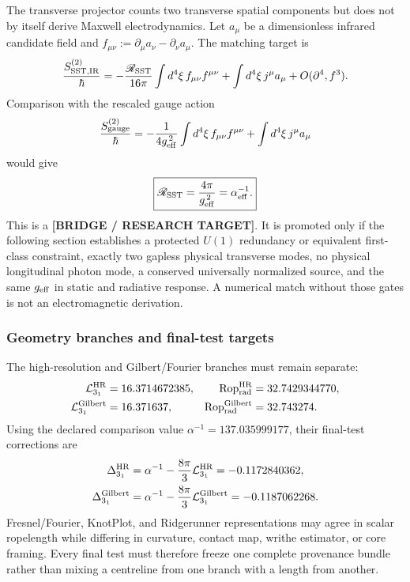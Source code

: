 The transverse projector counts two transverse spatial components but does
not by itself derive Maxwell electrodynamics.  Let \(a_\mu\) be a
dimensionless infrared candidate field and
\(f_{\mu\nu}:=\partial_\mu a_\nu-\partial_\nu a_\mu\).  The matching target is
\begin{align}
    \frac{S_{\rm SST,IR}^{(2)}}{\hbar}
    =
    -\frac{\mathscr R_{\rm SST}}{16\pi}
    \int d^4\xi\,f_{\mu\nu}f^{\mu\nu}
    +
    \int d^4\xi\,j^\mu a_\mu
    +
    O(\partial^4,f^3).
    \label{eq:rt_alpha_em_action_v0835}
\end{align}
Comparison with the rescaled gauge action
\begin{align}
    \frac{S_{\rm gauge}^{(2)}}{\hbar}
    =
    -\frac{1}{4g_{\rm eff}^{\,2}}
    \int d^4\xi\,f_{\mu\nu}f^{\mu\nu}
    +
    \int d^4\xi\,j^\mu a_\mu
\end{align}
would give
\begin{align}
    \boxed{
    \mathscr R_{\rm SST}
    =
    \frac{4\pi}{g_{\rm eff}^{\,2}}
    =
    \alpha_{\rm eff}^{-1}.
    }
    \label{eq:rt_alpha_em_stiffness_matching_v0835}
\end{align}
This is a \textbf{[BRIDGE / RESEARCH TARGET]}.  It is promoted only if the
following section establishes a protected \(U(1)\) redundancy or equivalent
first-class constraint, exactly two gapless physical transverse modes, no
physical longitudinal photon mode, a conserved universally normalized source,
and the same \(g_{\rm eff}\) in static and radiative response.  A numerical
match without those gates is not an electromagnetic derivation.

\subsubsection{Geometry branches and final-test targets}

The high-resolution and Gilbert/Fourier branches must remain separate:
\begin{align}
    \mathcal L_{3_1}^{\rm HR}
    &=
    16.3714672385,
    &
    \operatorname{Rop}_{\rm rad}^{\rm HR}
    &=
    32.7429344770,
    \\
    \mathcal L_{3_1}^{\rm Gilbert}
    &=
    16.371637,
    &
    \operatorname{Rop}_{\rm rad}^{\rm Gilbert}
    &=
    32.743274.
\end{align}
Using the declared comparison value
\(\alpha^{-1}=137.035999177\), their final-test corrections are
\begin{align}
    \Delta_{3_1}^{\rm HR}
    &=
    \alpha^{-1}
    -
    \frac{8\pi}{3}\mathcal L_{3_1}^{\rm HR}
    =
    -0.1172840362,
    \label{eq:rt_alpha_hr_delta_v0835}
    \\
    \Delta_{3_1}^{\rm Gilbert}
    &=
    \alpha^{-1}
    -
    \frac{8\pi}{3}\mathcal L_{3_1}^{\rm Gilbert}
    =
    -0.1187062268.
    \label{eq:rt_alpha_gilbert_delta_v0835}
\end{align}
Fresnel/Fourier, KnotPlot, and Ridgerunner representations may agree in scalar
ropelength while differing in curvature, contact map, writhe estimator, or
core framing.  Every final test must therefore freeze one complete provenance
bundle rather than mixing a centreline from one branch with a length from
another.

